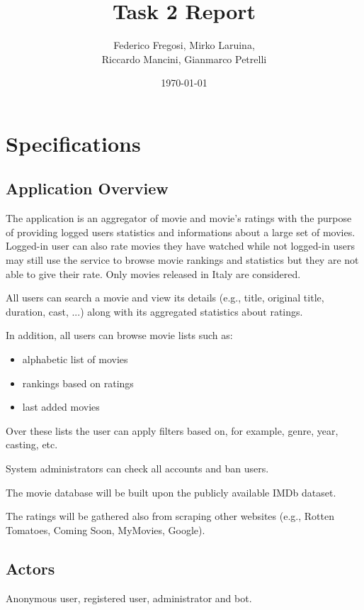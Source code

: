 \documentclass[10pt]{article}
\title{Task 2 Report}
\date{\today}
\author{Federico Fregosi, Mirko Laruina,\\
        Riccardo Mancini, Gianmarco Petrelli}
\begin{document}
\maketitle
\vfill
\tableofcontents
\vfill
\clearpage
\setcounter{page}{1}

\section{Specifications}

\subsection{Application Overview}
The application is an aggregator of movie and movie's ratings with the purpose 
of providing logged users statistics and informations about a large set of movies.
Logged-in user can also rate movies they have watched while not logged-in users 
may still use the service to browse movie rankings and statistics but they are not
able to give their rate. Only movies released in Italy are considered.

All users can search a movie and view its details (e.g., title, original title, duration, 
cast, ...) along with its aggregated statistics about ratings. 

In addition, all users can browse movie lists such as:
\begin{itemize}
    \item alphabetic list of movies
    \item rankings based on ratings
    \item last added movies
\end{itemize} 

Over these lists the user can apply filters based on, for example, genre, 
year, casting, etc.

System administrators can check all accounts and ban users.

The movie database will be built upon the publicly available IMDb dataset.

The ratings will be gathered also from scraping other websites 
(e.g., Rotten Tomatoes, Coming Soon, MyMovies, Google).

\subsection{Actors}
Anonymous user, registered user, administrator and bot.
\end{document}

